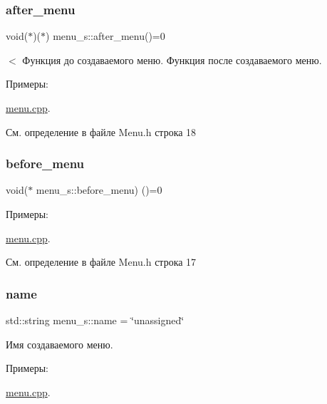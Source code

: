 \subsubsection{\texorpdfstring{after\+\_\+menu}{after\_menu}}
{\footnotesize\ttfamily void($\ast$)($\ast$) menu\+\_\+s\+::after\+\_\+menu()=0}

$<$ Функция до создаваемого меню. Функция после создаваемого меню. \begin{Desc}
\item[Примеры\+: ]\par
\hyperlink{menu_8cpp-example}{menu.\+cpp}.\end{Desc}


См. определение в файле Menu.\+h строка 18

\mbox{\label{structmenu__s_aa71bffe8004873d1f43eeeb4e17595c8}} 
\subsubsection{\texorpdfstring{before\+\_\+menu}{before\_menu}}
{\footnotesize\ttfamily void($\ast$ menu\+\_\+s\+::before\+\_\+menu) ()=0}

\begin{Desc}
\item[Примеры\+: ]\par
\hyperlink{menu_8cpp-example}{menu.\+cpp}.\end{Desc}


См. определение в файле Menu.\+h строка 17

\mbox{\label{structmenu__s_a2b4d6cd699b46daba2bb8297c11971aa}} 
\subsubsection{\texorpdfstring{name}{name}}
{\footnotesize\ttfamily std\+::string menu\+\_\+s\+::name = \char`\"{}unassigned\char`\"{}}

Имя создаваемого меню. \begin{Desc}
\item[Примеры\+: ]\par
\hyperlink{menu_8cpp-example}{menu.\+cpp}.\end{Desc}


